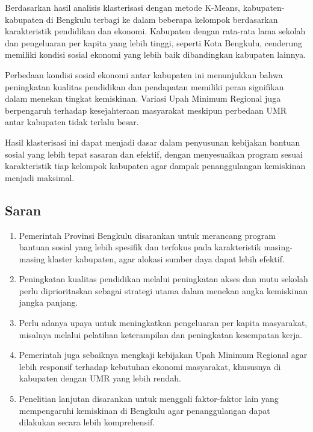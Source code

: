 \documentclass{article}
\begin{document}
Berdasarkan hasil analisis klasterisasi dengan metode K-Means, kabupaten-kabupaten di Bengkulu terbagi ke dalam beberapa kelompok berdasarkan karakteristik pendidikan dan ekonomi. Kabupaten dengan rata-rata lama sekolah dan pengeluaran per kapita yang lebih tinggi, seperti Kota Bengkulu, cenderung memiliki kondisi sosial ekonomi yang lebih baik dibandingkan kabupaten lainnya. 

Perbedaan kondisi sosial ekonomi antar kabupaten ini menunjukkan bahwa peningkatan kualitas pendidikan dan pendapatan memiliki peran signifikan dalam menekan tingkat kemiskinan. Variasi Upah Minimum Regional juga berpengaruh terhadap kesejahteraan masyarakat meskipun perbedaan UMR antar kabupaten tidak terlalu besar.

Hasil klasterisasi ini dapat menjadi dasar dalam penyusunan kebijakan bantuan sosial yang lebih tepat sasaran dan efektif, dengan menyesuaikan program sesuai karakteristik tiap kelompok kabupaten agar dampak penanggulangan kemiskinan menjadi maksimal.

\subsection{Saran}

\begin{enumerate}
    \item Pemerintah Provinsi Bengkulu disarankan untuk merancang program bantuan sosial yang lebih spesifik dan terfokus pada karakteristik masing-masing klaster kabupaten, agar alokasi sumber daya dapat lebih efektif.
    \item Peningkatan kualitas pendidikan melalui peningkatan akses dan mutu sekolah perlu diprioritaskan sebagai strategi utama dalam menekan angka kemiskinan jangka panjang.
    \item Perlu adanya upaya untuk meningkatkan pengeluaran per kapita masyarakat, misalnya melalui pelatihan keterampilan dan peningkatan kesempatan kerja.
    \item Pemerintah juga sebaiknya mengkaji kebijakan Upah Minimum Regional agar lebih responsif terhadap kebutuhan ekonomi masyarakat, khususnya di kabupaten dengan UMR yang lebih rendah.
    \item Penelitian lanjutan disarankan untuk menggali faktor-faktor lain yang mempengaruhi kemiskinan di Bengkulu agar penanggulangan dapat dilakukan secara lebih komprehensif.
\end{enumerate}



\clearpage
\renewcommand{\refname}{Daftar Pustaka}


\end{document}
